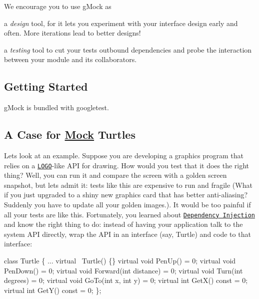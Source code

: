 We encourage you to use g\+Mock as


\begin{DoxyItemize}
\item a {\itshape design} tool, for it lets you experiment with your interface design early and often. More iterations lead to better designs!
\item a {\itshape testing} tool to cut your tests\textquotesingle{} outbound dependencies and probe the interaction between your module and its collaborators.
\end{DoxyItemize}

\subsection*{Getting Started}

g\+Mock is bundled with googletest.

\subsection*{A Case for \mbox{\hyperlink{classMock}{Mock}} Turtles}

Let\textquotesingle{}s look at an example. Suppose you are developing a graphics program that relies on a \href{https://en.wikipedia.org/wiki/Logo_programming_language}{\tt L\+O\+GO}-\/like A\+PI for drawing. How would you test that it does the right thing? Well, you can run it and compare the screen with a golden screen snapshot, but let\textquotesingle{}s admit it\+: tests like this are expensive to run and fragile (What if you just upgraded to a shiny new graphics card that has better anti-\/aliasing? Suddenly you have to update all your golden images.). It would be too painful if all your tests are like this. Fortunately, you learned about \href{https://en.wikipedia.org/wiki/Dependency_injection}{\tt Dependency Injection} and know the right thing to do\+: instead of having your application talk to the system A\+PI directly, wrap the A\+PI in an interface (say, {\ttfamily Turtle}) and code to that interface\+:


\begin{DoxyCode}
\textcolor{keyword}{class }Turtle \{
  ...
  \textcolor{keyword}{virtual} ~Turtle() \{\}
  \textcolor{keyword}{virtual} \textcolor{keywordtype}{void} PenUp() = 0;
  \textcolor{keyword}{virtual} \textcolor{keywordtype}{void} PenDown() = 0;
  \textcolor{keyword}{virtual} \textcolor{keywordtype}{void} Forward(\textcolor{keywordtype}{int} distance) = 0;
  \textcolor{keyword}{virtual} \textcolor{keywordtype}{void} Turn(\textcolor{keywordtype}{int} degrees) = 0;
  \textcolor{keyword}{virtual} \textcolor{keywordtype}{void} GoTo(\textcolor{keywordtype}{int} x, \textcolor{keywordtype}{int} y) = 0;
  \textcolor{keyword}{virtual} \textcolor{keywordtype}{int} GetX() \textcolor{keyword}{const} = 0;
  \textcolor{keyword}{virtual} \textcolor{keywordtype}{int} GetY() \textcolor{keyword}{const} = 0;
\};
\end{DoxyCode}


